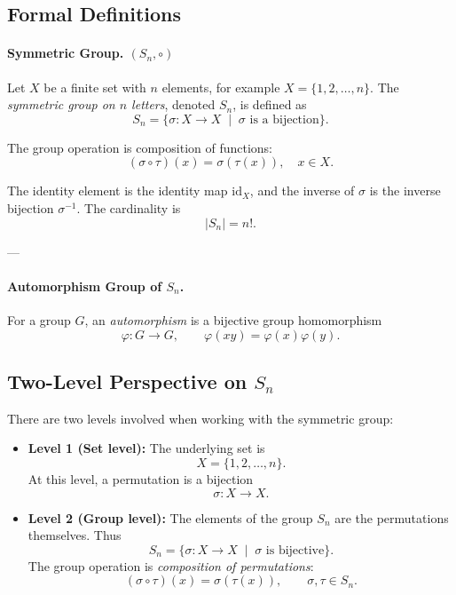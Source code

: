 \documentclass[12pt]{article}
\begin{document}
	\subsection*{Formal Definitions}
	
	\paragraph{Symmetric Group. $(S_n, \circ) $}  
	Let $X$ be a finite set with $n$ elements, for example $X = \{1,2,\dots,n\}$.  
	The \emph{symmetric group on $n$ letters}, denoted $S_n$, is defined as
	$$
	S_n = \{ \sigma : X \to X \;\mid\; \sigma \text{ is a bijection} \}.
	$$
	
	The group operation is composition of functions:
	$$
	(\sigma \circ \tau)(x) = \sigma(\tau(x)), \quad x \in X.
	$$
	
	The identity element is the identity map $\mathrm{id}_X$, and the inverse of $\sigma$ is the inverse bijection $\sigma^{-1}$.  
	The cardinality is
	$$
	|S_n| = n!.
	$$
	
	---
	
	\paragraph{Automorphism Group of $S_n$.}  
	For a group $G$, an \emph{automorphism} is a bijective group homomorphism
	$$
	\varphi : G \to G, \qquad \varphi(xy) = \varphi(x)\varphi(y).
	$$
    
    \subsection*{Two-Level Perspective on $S_n$}
    
    There are two levels involved when working with the symmetric group:
    
    \begin{itemize}
    	\item \textbf{Level 1 (Set level):}  
    	The underlying set is 
    	$$
    	X = \{1,2,\dots,n\}.
    	$$
    	At this level, a permutation is a bijection 
    	$$
    	\sigma : X \to X.
    	$$
    	
    	\item \textbf{Level 2 (Group level):}  
    	The elements of the group $S_n$ are the permutations themselves.  
    	Thus
    	$$
    	S_n = \{\sigma : X \to X \;\mid\; \sigma \text{ is bijective}\}.
    	$$
    	The group operation is \emph{composition of permutations}:
    	$$
    	(\sigma \circ \tau)(x) = \sigma(\tau(x)), \qquad \sigma,\tau \in S_n.
    	$$
    \end{itemize}
    
\end{document}
